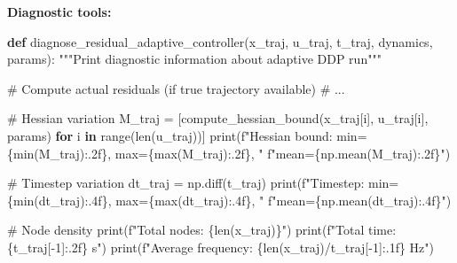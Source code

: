 \documentclass[
  letterpaper,
  DIV=11,
  numbers=noendperiod]{scrartcl}
\newenvironment{Shaded}{\begin{snugshade}}{\end{snugshade}}
\newcommand{\BuiltInTok}[1]{\textcolor[rgb]{0.00,0.23,0.31}{#1}}
\newcommand{\CommentTok}[1]{\textcolor[rgb]{0.37,0.37,0.37}{#1}}
\newcommand{\ControlFlowTok}[1]{\textcolor[rgb]{0.00,0.23,0.31}{\textbf{#1}}}
\newcommand{\DecValTok}[1]{\textcolor[rgb]{0.68,0.00,0.00}{#1}}
\newcommand{\KeywordTok}[1]{\textcolor[rgb]{0.00,0.23,0.31}{\textbf{#1}}}
\newcommand{\NormalTok}[1]{\textcolor[rgb]{0.00,0.23,0.31}{#1}}
\newcommand{\OperatorTok}[1]{\textcolor[rgb]{0.37,0.37,0.37}{#1}}
\newcommand{\SpecialCharTok}[1]{\textcolor[rgb]{0.37,0.37,0.37}{#1}}
\newcommand{\SpecialStringTok}[1]{\textcolor[rgb]{0.13,0.47,0.30}{#1}}
\begin{document}
\textbf{Diagnostic tools:}

\begin{Shaded}
\begin{Highlighting}[]
\KeywordTok{def}\NormalTok{ diagnose\_residual\_adaptive\_controller(x\_traj, u\_traj, t\_traj, dynamics, params):}
    \CommentTok{"""Print diagnostic information about adaptive DDP run"""}

    \CommentTok{\# Compute actual residuals (if true trajectory available)}
    \CommentTok{\# ...}

    \CommentTok{\# Hessian variation}
\NormalTok{    M\_traj }\OperatorTok{=}\NormalTok{ [compute\_hessian\_bound(x\_traj[i], u\_traj[i], params)}
              \ControlFlowTok{for}\NormalTok{ i }\KeywordTok{in} \BuiltInTok{range}\NormalTok{(}\BuiltInTok{len}\NormalTok{(u\_traj))]}
    \BuiltInTok{print}\NormalTok{(}\SpecialStringTok{f"Hessian bound: min=}\SpecialCharTok{\{}\BuiltInTok{min}\NormalTok{(M\_traj)}\SpecialCharTok{:.2f\}}\SpecialStringTok{, max=}\SpecialCharTok{\{}\BuiltInTok{max}\NormalTok{(M\_traj)}\SpecialCharTok{:.2f\}}\SpecialStringTok{, "}
          \SpecialStringTok{f"mean=}\SpecialCharTok{\{}\NormalTok{np}\SpecialCharTok{.}\NormalTok{mean(M\_traj)}\SpecialCharTok{:.2f\}}\SpecialStringTok{"}\NormalTok{)}

    \CommentTok{\# Timestep variation}
\NormalTok{    dt\_traj }\OperatorTok{=}\NormalTok{ np.diff(t\_traj)}
    \BuiltInTok{print}\NormalTok{(}\SpecialStringTok{f"Timestep: min=}\SpecialCharTok{\{}\BuiltInTok{min}\NormalTok{(dt\_traj)}\SpecialCharTok{:.4f\}}\SpecialStringTok{, max=}\SpecialCharTok{\{}\BuiltInTok{max}\NormalTok{(dt\_traj)}\SpecialCharTok{:.4f\}}\SpecialStringTok{, "}
          \SpecialStringTok{f"mean=}\SpecialCharTok{\{}\NormalTok{np}\SpecialCharTok{.}\NormalTok{mean(dt\_traj)}\SpecialCharTok{:.4f\}}\SpecialStringTok{"}\NormalTok{)}

    \CommentTok{\# Node density}
    \BuiltInTok{print}\NormalTok{(}\SpecialStringTok{f"Total nodes: }\SpecialCharTok{\{}\BuiltInTok{len}\NormalTok{(x\_traj)}\SpecialCharTok{\}}\SpecialStringTok{"}\NormalTok{)}
    \BuiltInTok{print}\NormalTok{(}\SpecialStringTok{f"Total time: }\SpecialCharTok{\{}\NormalTok{t\_traj[}\OperatorTok{{-}}\DecValTok{1}\NormalTok{]}\SpecialCharTok{:.2f\}}\SpecialStringTok{ s"}\NormalTok{)}
    \BuiltInTok{print}\NormalTok{(}\SpecialStringTok{f"Average frequency: }\SpecialCharTok{\{}\BuiltInTok{len}\NormalTok{(x\_traj)}\OperatorTok{/}\NormalTok{t\_traj[}\OperatorTok{{-}}\DecValTok{1}\NormalTok{]}\SpecialCharTok{:.1f\}}\SpecialStringTok{ Hz"}\NormalTok{)}
\end{Highlighting}
\end{Shaded}
\end{document}
